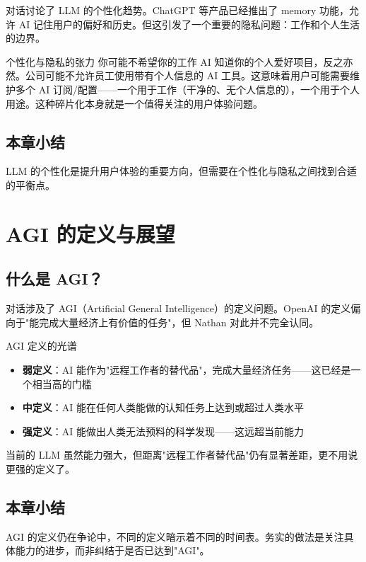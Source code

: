\documentclass[a4paper]{article}
\begin{document}
对话讨论了 LLM 的个性化趋势。ChatGPT 等产品已经推出了 memory 功能，允许 AI 记住用户的偏好和历史。但这引发了一个重要的隐私问题：工作和个人生活的边界。

\begin{warningbox}{个性化与隐私的张力}
你可能不希望你的工作 AI 知道你的个人爱好项目，反之亦然。公司可能不允许员工使用带有个人信息的 AI 工具。这意味着用户可能需要维护多个 AI 订阅/配置——一个用于工作（干净的、无个人信息的），一个用于个人用途。这种碎片化本身就是一个值得关注的用户体验问题。
\end{warningbox}

\subsection{本章小结}

LLM 的个性化是提升用户体验的重要方向，但需要在个性化与隐私之间找到合适的平衡点。

\section{AGI 的定义与展望}

\subsection{什么是 AGI？}

对话涉及了 AGI（Artificial General Intelligence）的定义问题。OpenAI 的定义偏向于"能完成大量经济上有价值的任务"，但 Nathan 对此并不完全认同。

\begin{importantbox}{AGI 定义的光谱}
\begin{itemize}
    \item \textbf{弱定义}：AI 能作为"远程工作者的替代品"，完成大量经济任务——这已经是一个相当高的门槛
    \item \textbf{中定义}：AI 能在任何人类能做的认知任务上达到或超过人类水平
    \item \textbf{强定义}：AI 能做出人类无法预料的科学发现——这远超当前能力
\end{itemize}
当前的 LLM 虽然能力强大，但距离"远程工作者替代品"仍有显著差距，更不用说更强的定义了。
\end{importantbox}

\subsection{本章小结}

AGI 的定义仍在争论中，不同的定义暗示着不同的时间表。务实的做法是关注具体能力的进步，而非纠结于是否已达到"AGI"。
\end{document}
